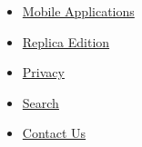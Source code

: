 \begin{itemize}
\tightlist
\item
  \href{http://www.nytimes.com/services/mobile/index.html}{Mobile
  Applications}
\item
  \href{http://eedition.nytimes.com/cgi-bin/signup.cgi?cc=37FYY}{Replica
  Edition}
\end{itemize}

\begin{itemize}
\tightlist
\item
  \href{http://www.nytimes.com/privacy}{Privacy}
\item
  \href{http://www.nytimes.com/search}{Search}
\item
  \href{http://www.nytimes.com/ref/membercenter/help/infoservdirectory.html}{Contact
  Us}
\end{itemize}
